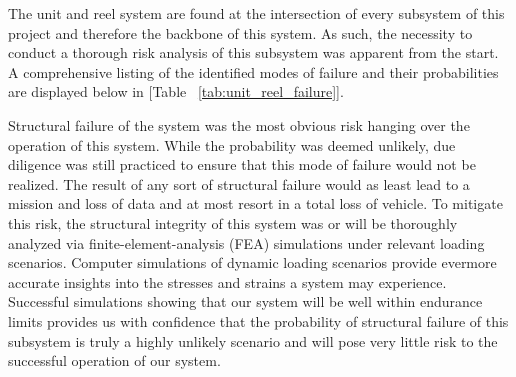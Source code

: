 \indent\indent The unit and reel system are found at the intersection of every subsystem of this project and therefore the backbone of this system. As such, the necessity to conduct a thorough risk analysis of this subsystem was apparent from the start. A comprehensive listing of the identified modes of failure and their probabilities are displayed below in [Table ~\ref{tab:unit_reel_failure}]. 

\begin{table}[H]
\caption{\label{tab:unit_reel_failure} Unit \& Reel System Failure Modes \& Probabilities}
\centering

\end{table}

Structural failure of the system was the most obvious risk hanging over the operation of this system. While the probability was deemed unlikely, due diligence was still practiced to ensure that this mode of failure would not be realized. The result of any sort of structural failure would as least lead to a mission and loss of data and at most resort in a total loss of vehicle. To mitigate this risk, the structural integrity of this system was or will be thoroughly analyzed via finite-element-analysis (FEA) simulations under relevant loading scenarios. Computer simulations of dynamic loading scenarios provide evermore accurate insights into the stresses and strains a system may experience. Successful simulations showing that our system will be well within endurance limits provides us with confidence that the probability of structural failure of this subsystem is truly a highly unlikely scenario and will pose very little risk to the successful operation of our system. 

